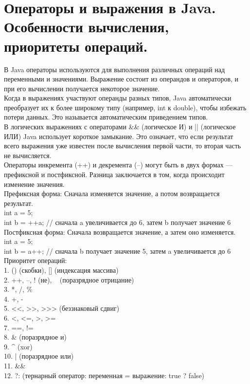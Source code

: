 \section{Операторы и выражения в Java. Особенности вычисления, приоритеты операций.}
В Java операторы используются для выполнения различных операций над переменными и значениями. Выражение состоит из операндов и операторов, и при его вычислении получается некоторое значение. \\
Когда в выражениях участвуют операнды разных типов, Java автоматически преобразует их к более широкому типу (например, int к double), чтобы избежать потери данных. Это называется автоматическим приведением типов. \\
В логических выражениях с операторами \&\& (логическое И) и || (логическое ИЛИ) Java использует короткое замыкание. Это означает, что если результат всего выражения уже известен после вычисления первой части, то вторая часть не вычисляется. \\ 
Операторы инкремента (++) и декремента (--) могут быть в двух формах — префиксной и постфиксной. Разница заключается в том, когда происходит изменение значения. \\
Префиксная форма: Сначала изменяется значение, а потом возвращается результат. \\
int a = 5; \\
int b = ++a;  // сначала a увеличивается до 6, затем b получает значение 6 \\
Постфиксная форма: Сначала возвращается значение, а затем оно изменяется. \\
int a = 5; \\
int b = a++;  // сначала b получает значение 5, затем a увеличивается до 6 \\
Приоритет операций: \\
1.	() (скобки), [] (индексация массива) \\
2.	++, --, ! (не), ~ (поразрядное отрицание) \\
3.	*, /, \% \\
4.	+, - \\
5.	<<, >>, >>> (беззнаковый сдвиг) \\
6.	<, <=, >, >= \\
7.	==, != \\
8.	\& (поразрядное и) \\
9.	\^{} (xor) \\
10. | (поразрядное или) \\
11.	\&\& \\
12.	?: (тернарный оператор: переменная = выражение: true ? false) \\
